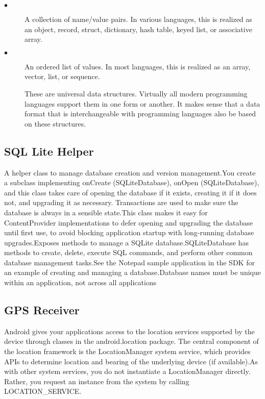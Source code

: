 \begin{description}
 \item[$\bullet$ ]  A collection of name/value pairs. In various languages, this is realized as an object, record, struct, dictionary, hash  table, keyed list, or associative array.
 \item[$\bullet$ ]  An ordered list of values. In most languages, this is realized as an array, vector, list, or sequence.

These are universal data structures. Virtually all modern programming languages support them in one form or another. It makes sense that a data format that is interchangeable with programming languages also be based on these structures.





\end{description}
\subsection{SQL Lite Helper}
A helper class to manage database creation and version management.You create a subclass implementing onCreate (SQLiteDatabase), onOpen (SQLiteDatabase), and this class takes care of opening the database if it exists, creating it if it does not, and upgrading it as necessary. Transactions are used to make sure the database is always in a sensible state.This class makes it easy for ContentProvider implementations to defer opening and upgrading the database until first use, to avoid blocking application startup with long-running database upgrades.Exposes methods to manage a SQLite database.SQLiteDatabase has methods to create, delete, execute SQL commands, and perform other common database management tasks.See the Notepad sample application in the SDK for an example of creating and managing a database.Database names must be unique within an application, not across all applications


\subsection{GPS Receiver}

Android gives your applications access to the location services supported by the device through classes in the android.location package. The central component of the location framework is the LocationManager system service, which provides APIs to determine location and bearing of the underlying device (if available).As with other system services, you do not instantiate a LocationManager directly. Rather, you request an instance from the system by calling LOCATION_SERVICE.



